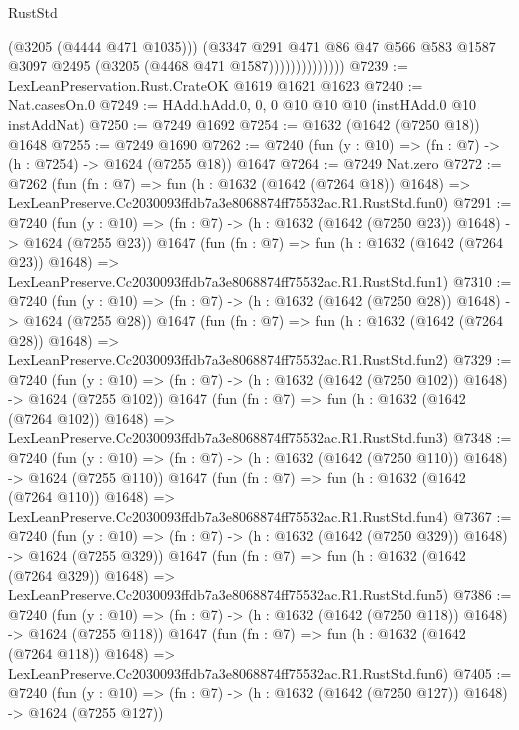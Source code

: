 \begin{lexlean}{RustStd}
\begin{coremodule}
                            (@3205 (@4444 @471 @1035)))
                          (@3347
                            @291
                            @471
                            @86
                            @47
                            @566
                            @583
                            @1587
                            @3097
                            @2495
                            (@3205 (@4468 @471 @1587))))))))))))))
@7239 := LexLeanPreservation.Rust.CrateOK @1619 @1621 @1623
@7240 := Nat.casesOn.{0}
@7249 := HAdd.hAdd.{0, 0, 0} @10 @10 @10 (instHAdd.{0} @10 instAddNat)
@7250 := @7249 @1692
@7254 := @1632 (@1642 (@7250 @18)) @1648
@7255 := @7249 @1690
@7262 := @7240 (fun (y : @10) => (fn : @7) -> (h : @7254) -> @1624 (@7255 @18)) @1647
@7264 := @7249 Nat.zero
@7272 := @7262
    (fun (fn : @7) =>
    fun (h : @1632 (@1642 (@7264 @18)) @1648) =>
    LexLeanPreserve.Cc2030093ffdb7a3e8068874ff75532ac.R1.RustStd.fun0)
@7291 := @7240
    (fun (y : @10) => (fn : @7) -> (h : @1632 (@1642 (@7250 @23)) @1648) -> @1624 (@7255 @23))
    @1647
    (fun (fn : @7) =>
    fun (h : @1632 (@1642 (@7264 @23)) @1648) =>
    LexLeanPreserve.Cc2030093ffdb7a3e8068874ff75532ac.R1.RustStd.fun1)
@7310 := @7240
    (fun (y : @10) => (fn : @7) -> (h : @1632 (@1642 (@7250 @28)) @1648) -> @1624 (@7255 @28))
    @1647
    (fun (fn : @7) =>
    fun (h : @1632 (@1642 (@7264 @28)) @1648) =>
    LexLeanPreserve.Cc2030093ffdb7a3e8068874ff75532ac.R1.RustStd.fun2)
@7329 := @7240
    (fun (y : @10) => (fn : @7) -> (h : @1632 (@1642 (@7250 @102)) @1648) -> @1624 (@7255 @102))
    @1647
    (fun (fn : @7) =>
    fun (h : @1632 (@1642 (@7264 @102)) @1648) =>
    LexLeanPreserve.Cc2030093ffdb7a3e8068874ff75532ac.R1.RustStd.fun3)
@7348 := @7240
    (fun (y : @10) => (fn : @7) -> (h : @1632 (@1642 (@7250 @110)) @1648) -> @1624 (@7255 @110))
    @1647
    (fun (fn : @7) =>
    fun (h : @1632 (@1642 (@7264 @110)) @1648) =>
    LexLeanPreserve.Cc2030093ffdb7a3e8068874ff75532ac.R1.RustStd.fun4)
@7367 := @7240
    (fun (y : @10) => (fn : @7) -> (h : @1632 (@1642 (@7250 @329)) @1648) -> @1624 (@7255 @329))
    @1647
    (fun (fn : @7) =>
    fun (h : @1632 (@1642 (@7264 @329)) @1648) =>
    LexLeanPreserve.Cc2030093ffdb7a3e8068874ff75532ac.R1.RustStd.fun5)
@7386 := @7240
    (fun (y : @10) => (fn : @7) -> (h : @1632 (@1642 (@7250 @118)) @1648) -> @1624 (@7255 @118))
    @1647
    (fun (fn : @7) =>
    fun (h : @1632 (@1642 (@7264 @118)) @1648) =>
    LexLeanPreserve.Cc2030093ffdb7a3e8068874ff75532ac.R1.RustStd.fun6)
@7405 := @7240
    (fun (y : @10) => (fn : @7) -> (h : @1632 (@1642 (@7250 @127)) @1648) -> @1624 (@7255 @127))

\end{coremodule}
\end{lexlean}
